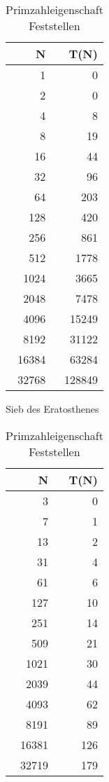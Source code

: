 \documentclass[paper=a4, fontsize=11pt]{scrartcl} %
\numberwithin{equation}{section} %
\numberwithin{figure}{section} %
\numberwithin{table}{section} %
\begin{document}
\begin{table}[h]
{\begin{tabular}{ r | r }
      N & T(N) \\
      \hline
      1 & 0 \\
      2 & 0 \\
      4 & 8 \\
      8 & 19 \\
      16 & 44 \\
      32 & 96 \\
      64 & 203 \\
      128 & 420 \\
      256 & 861 \\
      512 & 1778 \\
      1024 & 3665 \\
      2048 & 7478 \\
      4096 & 15249 \\
      8192 & 31122 \\
      16384 & 63284 \\
      32768 & 128849 \\
    \end{tabular}
    \caption{Sieb des Eratosthenes}
    \label{table:3}
  }
  \parbox{.5\linewidth}{
    \centering
    \begin{tabular}{ r | r }
      N & T(N) \\
      \hline
      3 & 0 \\
      7 & 1 \\
      13 & 2 \\
      31 & 4 \\
      61 & 6 \\
      127 & 10 \\
      251 & 14 \\
      509 & 21 \\
      1021 & 30 \\
      2039 & 44 \\
      4093 & 62 \\
      8191 & 89 \\
      16381 & 126 \\
      32719 & 179 \\
    \end{tabular}
    \caption{Primzahleigenschaft Feststellen}
    \label{table:4}
  }
\end{table}
\end{document}
